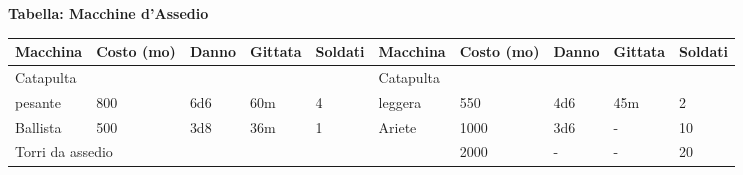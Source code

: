 \documentclass[a4paper,twoside,openany]{book}
\begin{document}
\medskip

\textbf{Tabella: Macchine d'Assedio}

\medskip


\begin{tabularx}{0.95\textwidth}{lXlll|lXlll}
\textbf{Macchina} & \textbf{Costo (mo)} & \textbf{Danno} & \textbf{Gittata} & \textbf{Soldati}&\textbf{Macchina} & \textbf{Costo (mo)} & \textbf{Danno} & \textbf{Gittata} & \textbf{Soldati}\\
\toprule
Catapulta &&&&&Catapulta&&&&\\
pesante & 800  & 6d6  & 60m & 4& leggera & 550 & 4d6  & 45m & 2\\
\hline
Ballista& 500  & 3d8  & 36m & 1&Ariete  & 1000 & 3d6  & -  & 10\\
\hline
\multicolumn{5}{l}{Torri da assedio}& & 2000 & -  & -  & 20\\


\end{tabularx}
\end{document}
